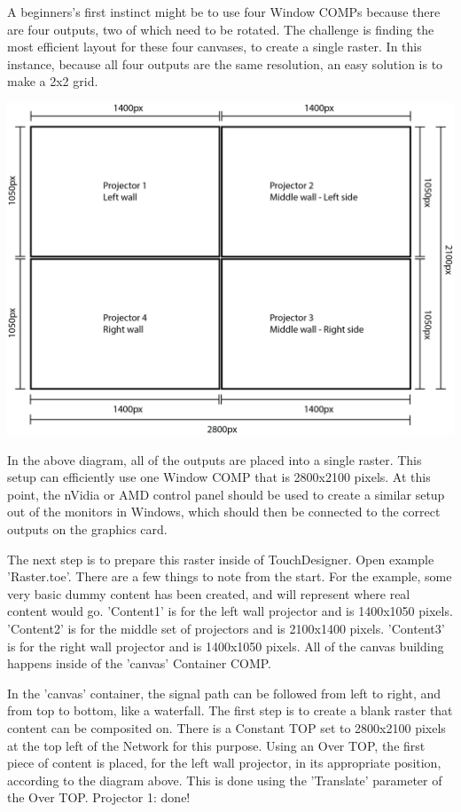 \begin{fullwidth}
A beginners's first instinct might be to use four Window COMPs because there are four outputs, two of which need to be rotated. The challenge is finding the most efficient layout for these four canvases, to create a single raster. In this instance, because all four outputs are the same resolution, an easy solution is to make a 2x2 grid. 

\begin{center}
\includegraphics{./img/10.3/raster-3.png}
\end{center}

In the above diagram, all of the outputs are placed into a single raster. This setup can efficiently use one Window COMP that is 2800x2100 pixels. At this point, the nVidia or AMD control panel should be used to create a similar setup out of the monitors in Windows, which should then be connected to the correct outputs on the graphics card.

The next step is to prepare this raster inside of TouchDesigner. Open example 'Raster.toe'. There are a few things to note from the start. For the example, some very basic dummy content has been created, and will represent where real content would go. 'Content1' is for the left wall projector and is 1400x1050 pixels. 'Content2' is for the middle set of projectors and is 2100x1400 pixels. 'Content3' is for the right wall projector and is 1400x1050 pixels. All of the canvas building happens inside of the 'canvas' Container COMP.

In the 'canvas' container, the signal path can be followed from left to right, and from top to bottom, like a waterfall. The first step is to create a blank raster that content can be composited on. There is a Constant TOP set to 2800x2100 pixels at the top left of the Network for this purpose. Using an Over TOP, the first piece of content is placed, for the left wall projector, in its appropriate position, according to the diagram above. This is done using the 'Translate' parameter of the Over TOP. Projector 1: done!


\end{fullwidth}
